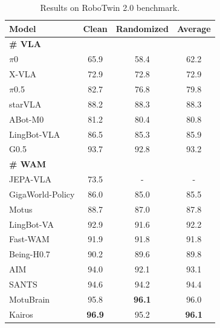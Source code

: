\documentclass{llmxive}
\begin{document}
\begin{table}[htbp]
  \centering
  \small
  \begin{tabular}{l c c | c} 
    \toprule
    \textbf{Model} & \textbf{Clean} & \textbf{Randomized} & \textbf{Average} \\ 
\midrule
\midrule
\textbf{\# VLA}& & \\
$\pi$0 \citep{black2026pi0visionlanguageactionflowmodel} & 65.9 & 58.4 &62.2 \\
X-VLA \citep{zheng2025xvlasoftpromptedtransformerscalable} &72.9 &72.8 &72.9 \\
$\pi$0.5 \citep{intelligence2025pi05visionlanguageactionmodelopenworld} & 82.7 & 76.8 &79.8 \\
starVLA  \citep{community2026starvla} & 88.2 & 88.3 & 88.3 \\
ABot-M0 \citep{yang2026abot}  & 81.2 &80.4 & 80.8 \\
LingBot-VLA  \citep{wu2026pragmatic} &86.5& 85.3 & 85.9\\
G0.5 \citep{galaxea2026g05} & 93.7 & 92.8 & 93.2 \\
\midrule
\midrule
\textbf{\# WAM}& & \\
JEPA-VLA \citep{miao2026jepavlavideopredictiveembedding} & 73.5 & - & -  \\
GigaWorld-Policy \citep{ye2026gigaworld}& 86.0 & 85.0 & 85.5 \\
Motus \citep{bi2025motusunifiedlatentaction} & 88.7 & 87.0 & 87.8 \\
LingBot-VA \cite{lingbot-va2026} & 92.9 & 91.6 & 92.2 \\
Fast-WAM \citep{yuan2026fastwam} & 91.9 & 91.8 & 91.8 \\
Being-H0.7 \citep{beingbeyond2026beingh07} & 90.2 & 89.6 & 89.8 \\
AIM \citep{fan2026aimintentawareunifiedworld}& 94.0 & 92.1 & 93.1\\
SANTS \citep{sun2026santsstateadaptiveschedulerworld}& 94.6 & 94.2 & 94.4 \\
MotuBrain \citep{motubrainteam2026motubrainadvancedworldaction} & 95.8 & \textbf{96.1} & 96.0  \\
\midrule
\midrule
\rowcolor{gray!20} Kairos & \textbf{96.9}  & 95.2 & \textbf{96.1} \\
\bottomrule 
  \end{tabular}
\caption{Results on RoboTwin 2.0 benchmark.}
\label{RoboTwin_Eval_results}
\end{table}
\end{document}
